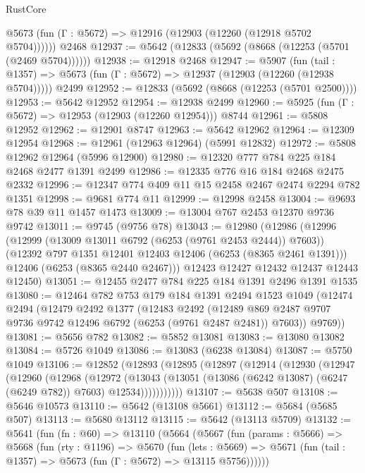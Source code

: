 \begin{lexlean}{RustCore}
\begin{coremodule}
      @5673 (fun (Γ : @5672) => @12916 (@12903 (@12260 (@12918 @5702 @5704))))))
    @2468
@12937 := @5642 (@12833 (@5692 (@8668 (@12253 (@5701 (@2469 @5704))))))
@12938 := @12918 @2468
@12947 := @5907
    (fun (tail : @1357) => @5673 (fun (Γ : @5672) => @12937 (@12903 (@12260 (@12938 @5704)))))
    @2499
@12952 := @12833 (@5692 (@8668 (@12253 (@5701 @2500))))
@12953 := @5642 @12952
@12954 := @12938 @2499
@12960 := @5925 (fun (Γ : @5672) => @12953 (@12903 (@12260 @12954))) @8744
@12961 := @5808 @12952
@12962 := @12901 @8747
@12963 := @5642 @12962
@12964 := @12309 @12954
@12968 := @12961 (@12963 @12964) (@5991 @12832)
@12972 := @5808 @12962 @12964 (@5996 @12900)
@12980 := @12320 @777 @784 @225 @184 @2468 @2477 @1391 @2499
@12986 := @12335 @776 @16 @184 @2468 @2475 @2332
@12996 := @12347 @774 @409 @11 @15 @2458 @2467 @2474 @2294 @782 @1351
@12998 := @9681 @774 @11
@12999 := @12998 @2458
@13004 := @9693 @78 @39 @11 @1457 @1473
@13009 := @13004 @767 @2453 @12370 @9736 @9742
@13011 := @9745 (@9756 @78)
@13043 := @12980
    (@12986
      (@12996
        (@12999 (@13009 @13011 @6792 (@6253 (@9761 @2453 @2444)) @7603))
        (@12392 @797 @1351 @12401 @12403 @12406 (@6253 (@8365 @2461 @1391)))
        @12406
        (@6253 (@8365 @2440 @2467)))
      @12423
      @12427
      @12432
      @12437
      @12443
      @12450)
@13051 := @12455 @2477 @784 @225 @184 @1391 @2496 @1391 @1535
@13080 := @12464
    @782
    @753
    @179
    @184
    @1391
    @2494
    @1523
    @1049
    (@12474
      @2494
      (@12479
        @2492
        @1377
        (@12483
          @2492
          (@12489 @869 @2487 @9707 @9736 @9742 @12496 @6792 (@6253 (@9761 @2487 @2481)) @7603))
        @9769))
@13081 := @5656 @782
@13082 := @5852 @13081
@13083 := @13080 @13082
@13084 := @5726 @1049
@13086 := @13083 (@6238 @13084)
@13087 := @5750 @1049
@13106 := @12852
    (@12893
      (@12895
        (@12897
          (@12914
            (@12930
              (@12947
                (@12960
                  (@12968
                    (@12972
                      (@13043
                        (@13051 (@13086 (@6242 @13087) (@6247 (@6249 @782)) @7603) @12534)))))))))))
@13107 := @5638 @507
@13108 := @5646 @10573
@13110 := @5642 (@13108 @5661)
@13112 := @5684 (@5685 @507)
@13113 := @5680 @13112
@13115 := @5642 (@13113 @5709)
@13132 := @5641
    (fun (fn : @60) =>
    @13110
      (@5664
        (@5667
          (fun (params : @5666) =>
          @5668
            (fun (rty : @1196) =>
            @5670
              (fun (lets : @5669) =>
              @5671 (fun (tail : @1357) => @5673 (fun (Γ : @5672) => @13115 @5756))))))

\end{coremodule}
\end{lexlean}
